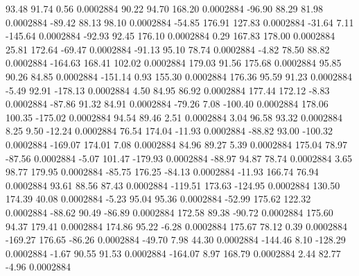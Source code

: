        93.48       91.74        0.56     0.0002884
       90.22       94.70      168.20     0.0002884
      -96.90       88.29       81.98     0.0002884
      -89.42       88.13       98.10     0.0002884
      -54.85      176.91      127.83     0.0002884
      -31.64        7.11     -145.64     0.0002884
      -92.93       92.45      176.10     0.0002884
        0.29      167.83      178.00     0.0002884
       25.81      172.64      -69.47     0.0002884
      -91.13       95.10       78.74     0.0002884
       -4.82       78.50       88.82     0.0002884
     -164.63      168.41      102.02     0.0002884
      179.03       91.56      175.68     0.0002884
       95.85       90.26       84.85     0.0002884
     -151.14        0.93      155.30     0.0002884
      176.36       95.59       91.23     0.0002884
       -5.49       92.91     -178.13     0.0002884
        4.50       84.95       86.92     0.0002884
      177.44      172.12       -8.83     0.0002884
      -87.86       91.32       84.91     0.0002884
      -79.26        7.08     -100.40     0.0002884
      178.06      100.35     -175.02     0.0002884
       94.54       89.46        2.51     0.0002884
        3.04       96.58       93.32     0.0002884
        8.25        9.50      -12.24     0.0002884
       76.54      174.04      -11.93     0.0002884
      -88.82       93.00     -100.32     0.0002884
     -169.07      174.01        7.08     0.0002884
       84.96       89.27        5.39     0.0002884
      175.04       78.97      -87.56     0.0002884
       -5.07      101.47     -179.93     0.0002884
      -88.97       94.87       78.74     0.0002884
        3.65       98.77      179.95     0.0002884
      -85.75      176.25      -84.13     0.0002884
      -11.93      166.74       76.94     0.0002884
       93.61       88.56       87.43     0.0002884
     -119.51      173.63     -124.95     0.0002884
      130.50      174.39       40.08     0.0002884
       -5.23       95.04       95.36     0.0002884
      -52.99      175.62      122.32     0.0002884
      -88.62       90.49      -86.89     0.0002884
      172.58       89.38      -90.72     0.0002884
      175.60       94.37      179.41     0.0002884
      174.86       95.22       -6.28     0.0002884
      175.67       78.12        0.39     0.0002884
     -169.27      176.65      -86.26     0.0002884
      -49.70        7.98       44.30     0.0002884
     -144.46        8.10     -128.29     0.0002884
       -1.67       90.55       91.53     0.0002884
     -164.07        8.97      168.79     0.0002884
        2.44       82.77       -4.96     0.0002884
